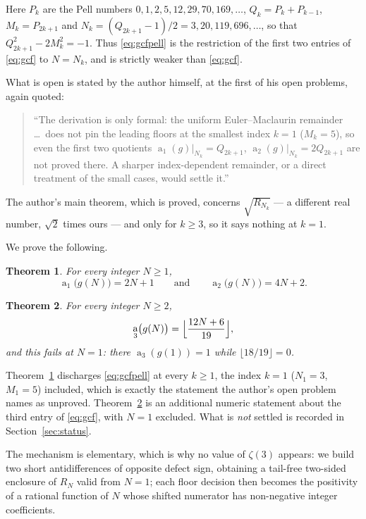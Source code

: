 \documentclass[11pt]{amsart}
\newtheorem{theorem}{Theorem}
\theoremstyle{definition}
\theoremstyle{remark}
\DeclareMathOperator{\PQ}{a}
\newcommand{\Rt}{R}
\begin{document}
Here $P_k$ are the Pell numbers $0,1,2,5,12,29,70,169,\dots$, $Q_k=P_k+P_{k-1}$,
$M_k=P_{2k+1}$ and $N_k=(Q_{2k+1}-1)/2=3,20,119,696,\ldots$, so that
$Q_{2k+1}^2-2M_k^2=-1$. Thus \eqref{eq:gcfpell} is the restriction of the first
two entries of \eqref{eq:gcf} to $N=N_k$, and is strictly weaker than
\eqref{eq:gcf}.

What is open is stated by the author himself, at the first of his open problems,
again quoted:
\begin{quote}
``The derivation is only formal: the uniform Euler--Maclaurin remainder
\dots\ does not pin the leading floors at the smallest index
$k=1$ ($M_k=5$), so even the first two quotients
$\PQ_1(g)|_{N_k}=Q_{2k+1}$, $\PQ_2(g)|_{N_k}=2Q_{2k+1}$ are not proved there.
A sharper index-dependent remainder, or a direct treatment of the small cases,
would settle it.''
\end{quote}
The author's main theorem, which is proved, concerns $\sqrt{\Rt_{N_k}}$ --- a
different real number, $\sqrt2$ times ours --- and only for $k\ge3$, so it says
nothing at $k=1$.

We prove the following.

\begin{theorem}\label{thm:a12}
For every integer $N\ge1$,
\[
 \PQ_1\bigl(g(N)\bigr)=2N+1
 \qquad\text{and}\qquad
 \PQ_2\bigl(g(N)\bigr)=4N+2 .
\]
\end{theorem}

\begin{theorem}\label{thm:a3}
For every integer $N\ge2$,
\[
 \PQ_3\bigl(g(N)\bigr)=\Bigl\lfloor\frac{12N+6}{19}\Bigr\rfloor ,
\]
and this fails at $N=1$: there $\PQ_3(g(1))=1$ while
$\lfloor 18/19\rfloor=0$.
\end{theorem}

Theorem~\ref{thm:a12} discharges \eqref{eq:gcfpell} at every $k\ge1$, the
index $k=1$ ($N_1=3$, $M_1=5$) included, which is exactly the statement the
author's open problem names as unproved. Theorem~\ref{thm:a3} is an additional
numeric statement about the third entry of \eqref{eq:gcf}, with $N=1$ excluded.
What is \emph{not} settled is recorded in Section~\ref{sec:status}.

The mechanism is elementary, which is why no value of $\zeta(3)$ appears: we
build two short antidifferences of opposite defect sign, obtaining a tail-free
two-sided enclosure of $\Rt_N$ valid from $N=1$; each floor decision then becomes
the positivity of a rational function of $N$ whose shifted numerator has
non-negative integer coefficients.
\end{document}
